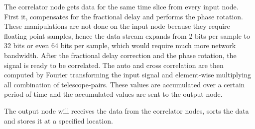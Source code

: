 The correlator node gets data for the same time slice from every input
node. First it, compensates for the fractional delay and performs the
phase rotation. These manipulations are not done on the input node
because they require floating point samples, hence the data stream
expands from 2 bits per sample to 32 bits or even 64 bits per sample,
which would require much more network bandwidth. After the fractional
delay correction and the phase rotation, the signal is ready to be
correlated.  The auto and cross correlation are then computed by
Fourier transforming the input signal and element-wise multiplying all
combination of telescope-pairs. These values are accumulated over a
certain period of time and the accumulated values are sent to the
output node.

The output node will receives the data from the correlator nodes,
sorts the data and stores it at a specified location.

